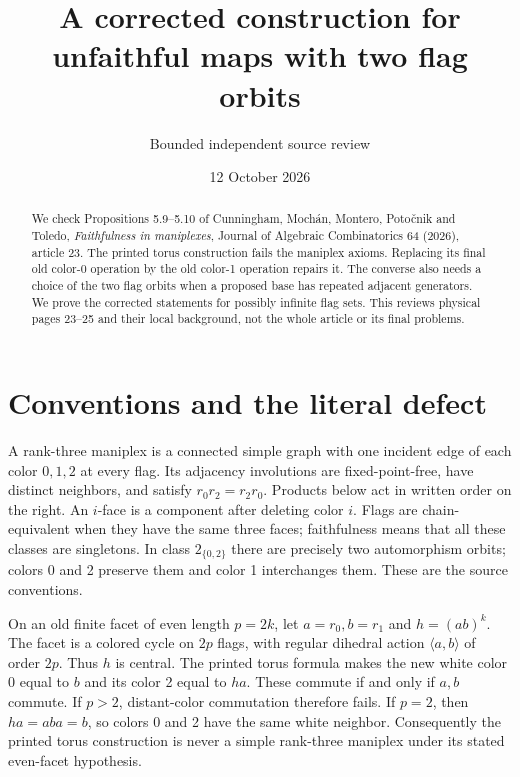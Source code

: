 \documentclass[a4paper,11pt]{article}
\title{A corrected construction for unfaithful maps with two flag orbits}
\author{Bounded independent source review}\date{12 October 2026}
\begin{document}
\maketitle
\begin{abstract}
We check Propositions 5.9--5.10 of Cunningham, Mochán, Montero, Potočnik
and Toledo, \emph{Faithfulness in maniplexes}, Journal of Algebraic
Combinatorics 64 (2026), article 23. The printed torus construction fails the
maniplex axioms. Replacing its final old color-0 operation by the old color-1
operation repairs it. The converse also needs a choice of the two flag orbits
when a proposed base has repeated adjacent generators. We prove the corrected
statements for possibly infinite flag sets. This reviews physical pages
23--25 and their local background, not the whole article or its final problems.
\end{abstract}

\section{Conventions and the literal defect}
A rank-three maniplex is a connected simple graph with one incident edge of
each color $0,1,2$ at every flag. Its adjacency involutions are fixed-point-free,
have distinct neighbors, and satisfy $r_0r_2=r_2r_0$. Products below act in
written order on the right. An $i$-face is a component after deleting color
$i$. Flags are chain-equivalent when they have the same three faces;
faithfulness means that all these classes are singletons. In class
$2_{\{0,2\}}$ there are precisely two automorphism orbits; colors 0 and 2
preserve them and color 1 interchanges them. These are the source conventions.

On an old finite facet of even length $p=2k$, let $a=r_0,b=r_1$ and
$h=(ab)^k$. The facet is a colored cycle on $2p$ flags, with regular dihedral
action $\langle a,b\rangle$ of order $2p$. Thus $h$ is central. The printed
torus formula makes the new white color 0 equal to $b$ and its color 2 equal
to $ha$. These commute if and only if $a,b$ commute. If $p>2$, distant-color
commutation therefore fails. If $p=2$, then $ha=aba=b$, so colors 0 and 2
have the same white neighbor. Consequently the printed torus construction is
never a simple rank-three maniplex under its stated even-facet hypothesis.
\end{document}
